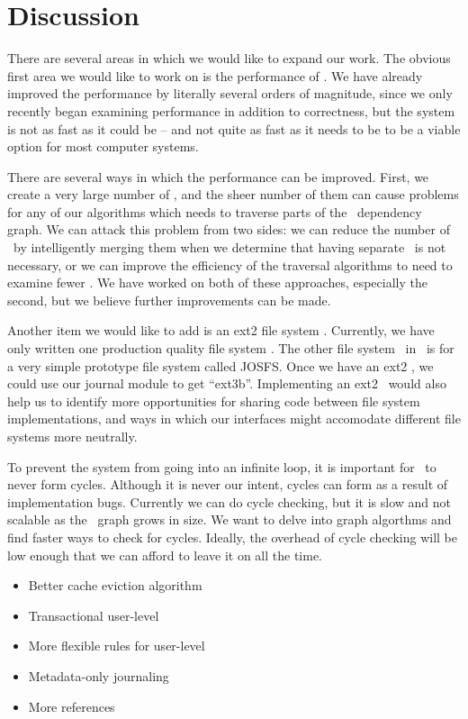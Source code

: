 \section {Discussion}
\label{sec:discussion}

There are several areas in which we would like to expand our work. The obvious
first area we would like to work on is the performance of \Kudos. We have
already improved the performance by literally several orders of magnitude, since
we only recently began examining performance in addition to correctness, but the
system is not as fast as it could be -- and not quite as fast as it needs to be
to be a viable option for most computer systems.

There are several ways in which the performance can be improved. First, we
create a very large number of \chdescs, and the sheer number of them can cause
problems for any of our algorithms which needs to traverse parts of the \chdesc\
dependency graph. We can attack this problem from two sides: we can reduce the
number of \chdescs\ by intelligently merging them when we determine that having
separate \chdescs\ is not necessary, or we can improve the efficiency of the
traversal algorithms to need to examine fewer \chdescs. We have worked on both
of these approaches, especially the second, but we believe further improvements
can be made.

Another item we would like to add is an ext2 file system \module. Currently,
we have only written one production quality file system \module. The other
file system \module\ in \Kudos\ is for a very simple prototype file system
called JOSFS. Once we have an ext2 \module, we could use our journal module to
get ``ext3b''. Implementing an ext2 \module\ would also help us to identify
more opportunities for sharing code between file system implementations, and
ways in which our interfaces might accomodate different file systems more
neutrally.

To prevent the system from going into an infinite loop, it is important for
\chdescs\ to never form cycles. Although it is never our intent, cycles can
form as a result of implementation bugs. Currently we can do cycle checking,
but it is slow and not scalable as the \chdesc\ graph grows in size. We want to
delve into graph algorthms and find faster ways to check for cycles. Ideally,
the overhead of cycle checking will be low enough that we can afford to leave
it on all the time.

\begin{itemize}
\item Better cache eviction algorithm
\item Transactional user-level \chdescs
\item More flexible rules for user-level \chdescs
\item Metadata-only journaling
\item More references
\end{itemize}
